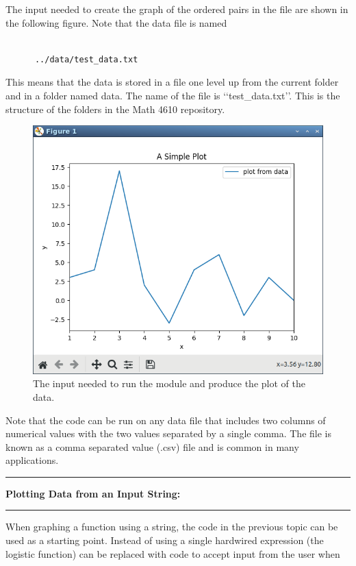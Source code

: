 \documentclass[10pt,fleqn]{article}
\begin{document}
The input needed to create the graph of the ordered pairs in the file are shown
in the following figure. Note that the data file is named
\begin{verbatim} 

      ../data/test_data.txt

\end{verbatim} 
This means that the data is stored in a file one level up from the current
folder and in a folder named data. The name of the file is
\lq\lq test\_data.txt\rq\rq. This is the structure of the folders in the Math
4610 repository.
\begin{figure}[h]
\centering
\includegraphics[width=6.0in]{../images/2ddataplot_03.png}
\vskip0.1in
\caption{The input needed to run the module and produce the plot of the data.}
\end{figure}
\eject
Note that the code can be run on any data file that includes two columns of
numerical values with the two values separated by a single comma. The file is
known as a comma separated value (.csv) file and is common in many applications.
\vskip0.1in\hrule\vskip0.1in\noindent
{\bf Plotting Data from an Input String:} 
\vskip0.1in\hrule\vskip0.1in\noindent
When graphing a function using a string, the code in the previous topic can be
used as a starting point. Instead of using a single hardwired expression (the
logistic function) can be replaced with code to accept input from the user when
\end{document}
